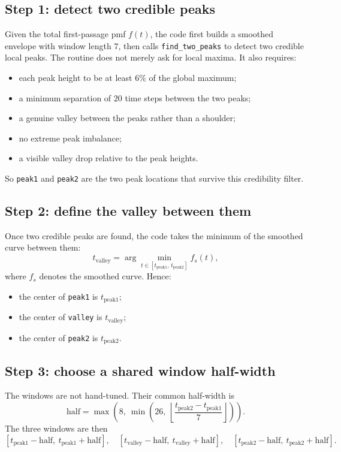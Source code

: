 \documentclass[11pt]{article}
\begin{document}
\subsection{Step 1: detect two credible peaks}
Given the total first-passage pmf $f(t)$, the code first builds a smoothed envelope with window length $7$, then calls \texttt{find\_two\_peaks} to detect two credible local peaks. The routine does not merely ask for local maxima. It also requires:
\begin{itemize}
  \item each peak height to be at least $6\%$ of the global maximum;
  \item a minimum separation of $20$ time steps between the two peaks;
  \item a genuine valley between the peaks rather than a shoulder;
  \item no extreme peak imbalance;
  \item a visible valley drop relative to the peak heights.
\end{itemize}
So \texttt{peak1} and \texttt{peak2} are the two peak locations that survive this credibility filter.

\subsection{Step 2: define the valley between them}
Once two credible peaks are found, the code takes the minimum of the smoothed curve between them:
\[
t_{\mathrm{valley}}=\arg\min_{t\in[t_{\mathrm{peak1}},\,t_{\mathrm{peak2}}]} f_s(t),
\]
where $f_s$ denotes the smoothed curve. Hence:
\begin{itemize}
  \item the center of \texttt{peak1} is $t_{\mathrm{peak1}}$;
  \item the center of \texttt{valley} is $t_{\mathrm{valley}}$;
  \item the center of \texttt{peak2} is $t_{\mathrm{peak2}}$.
\end{itemize}

\subsection{Step 3: choose a shared window half-width}
The windows are not hand-tuned. Their common half-width is
\[
\mathrm{half}=\max\!\left(8,\ \min\!\left(26,\ \left\lfloor\frac{t_{\mathrm{peak2}}-t_{\mathrm{peak1}}}{7}\right\rfloor\right)\right).
\]
The three windows are then
\[
[t_{\mathrm{peak1}}-\mathrm{half},\ t_{\mathrm{peak1}}+\mathrm{half}],
\quad
[t_{\mathrm{valley}}-\mathrm{half},\ t_{\mathrm{valley}}+\mathrm{half}],
\quad
[t_{\mathrm{peak2}}-\mathrm{half},\ t_{\mathrm{peak2}}+\mathrm{half}].
\]
\end{document}
